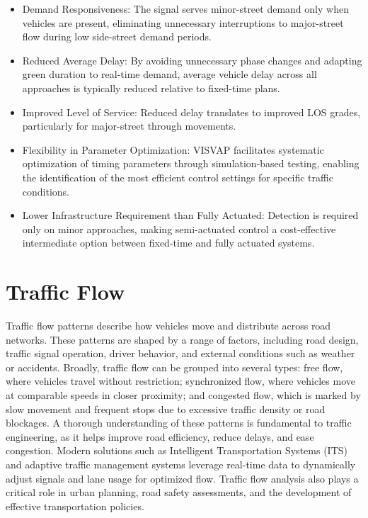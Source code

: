 \begin{itemize}
    \item Demand Responsiveness: The signal serves minor-street 
    demand only when vehicles are present, eliminating 
    unnecessary interruptions to major-street flow during 
    low side-street demand periods.

    \item Reduced Average Delay: By avoiding unnecessary 
    phase changes and adapting green duration to real-time 
    demand, average vehicle delay across all approaches is 
    typically reduced relative to fixed-time plans.

    \item Improved Level of Service: Reduced delay 
    translates to improved LOS grades, particularly for 
    major-street through movements.

    \item Flexibility in Parameter Optimization: VISVAP 
    facilitates systematic optimization of timing parameters 
    through simulation-based testing, enabling the 
    identification of the most efficient control settings 
    for specific traffic conditions.

    \item Lower Infrastructure Requirement than Fully 
    Actuated: Detection is required only on minor approaches, 
    making semi-actuated control a cost-effective 
    intermediate option between fixed-time and fully actuated 
    systems.

\end{itemize}

\section{Traffic Flow}

Traffic flow patterns describe how vehicles move and 
distribute across road networks. These patterns are shaped 
by a range of factors, including road design, traffic signal 
operation, driver behavior, and external conditions such as 
weather or accidents. Broadly, traffic flow can be grouped 
into several types: free flow, where vehicles travel without 
restriction; synchronized flow, where vehicles move at 
comparable speeds in closer proximity; and congested flow, 
which is marked by slow movement and frequent stops due to 
excessive traffic density or road blockages. A thorough 
understanding of these patterns is fundamental to traffic 
engineering, as it helps improve road efficiency, reduce 
delays, and ease congestion. Modern solutions such as 
Intelligent Transportation Systems (ITS) and adaptive 
traffic management systems leverage real-time data to 
dynamically adjust signals and lane usage for optimized flow.
Traffic flow analysis also plays a critical role in urban 
planning, road safety assessments, and the development of 
effective transportation policies.



